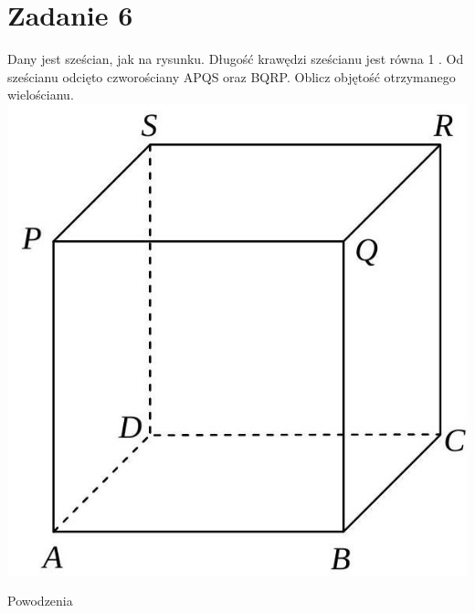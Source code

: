 \documentclass[10pt]{article}
\begin{document}
\section*{Zadanie 6}
Dany jest sześcian, jak na rysunku. Długość krawędzi sześcianu jest równa 1 . Od sześcianu odcięto czworościany APQS oraz BQRP. Oblicz objętość otrzymanego wielościanu.\\
\includegraphics[max width=\textwidth, center]{2024_11_21_8eddb11774ef9ec7d4a6g-1}

Powodzenia
\end{document}

